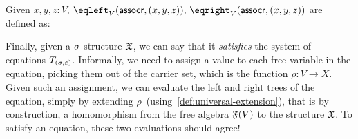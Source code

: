\begin{example}
    Given $x, y, z : V$, $\eqleft_{V}(\term{assocr}, (x,y,z)),\,\eqright_{V}(\term{assocr}, (x,y,z))$
    are defined as:
    \begin{center}
    \end{center}
\end{example}
Finally, given a $\sigma$-structure $\mathfrak{X}$,
we can say that it \emph{satisfies} the system of equations $T_{(\sigma,\varepsilon)}$.
%
Informally, we need to assign a value to each free variable in the equation, picking them out of the carrier set,
which is the function $\rho : V \to X$.
%
Given such an assignment, we can evaluate the left and right trees of the equation,
simply by extending $\rho\,$ (using~\cref{def:universal-extension}),
that is by construction, a homomorphism from the free algebra $\mathfrak{F}(V)$ to the structure $\mathfrak{X}$.
%
To satisfy an equation, these two evaluations should agree!
%

